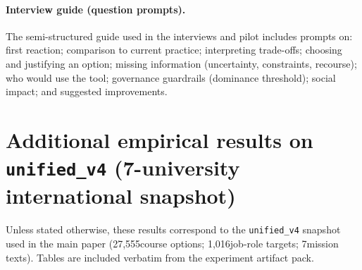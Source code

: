 \documentclass[sigconf,review]{acmart}
\newcommand{\NumCourses}{27,555}             %
\newcommand{\NumOccupations}{1,016}          %
\newcommand{\NumMissionsMain}{7}             %
\begin{document}
\paragraph{Interview guide (question prompts).} The semi-structured guide used in the interviews and pilot includes prompts on: first reaction; comparison to current practice; interpreting trade-offs; choosing and justifying an option; missing information (uncertainty, constraints, recourse); who would use the tool; governance guardrails (dominance threshold); social impact; and suggested improvements.

\section{Additional empirical results on \texttt{unified\_v4} (7-university international snapshot)}
\label{sec:supp-results}
Unless stated otherwise, these results correspond to the \texttt{unified\_v4} snapshot used in the main paper (\NumCourses course options; \NumOccupations job-role targets; \NumMissionsMain mission texts). Tables are included verbatim from the experiment artifact pack.
\end{document}
